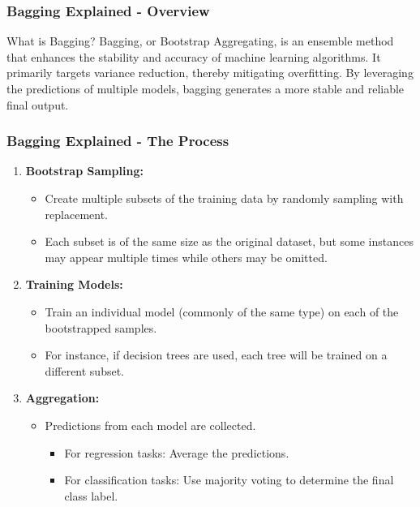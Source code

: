 \documentclass[aspectratio=169]{beamer}
\begin{document}
\begin{frame}[fragile]
    \frametitle{Bagging Explained - Overview}
    \begin{block}{What is Bagging?}
        Bagging, or Bootstrap Aggregating, is an ensemble method that enhances the stability and accuracy of machine learning algorithms. It primarily targets variance reduction, thereby mitigating overfitting. By leveraging the predictions of multiple models, bagging generates a more stable and reliable final output.
    \end{block}
\end{frame}

\begin{frame}[fragile]
    \frametitle{Bagging Explained - The Process}
    \begin{enumerate}
        \item \textbf{Bootstrap Sampling:}
        \begin{itemize}
            \item Create multiple subsets of the training data by randomly sampling with replacement.
            \item Each subset is of the same size as the original dataset, but some instances may appear multiple times while others may be omitted.
        \end{itemize}
        
        \item \textbf{Training Models:}
        \begin{itemize}
            \item Train an individual model (commonly of the same type) on each of the bootstrapped samples.
            \item For instance, if decision trees are used, each tree will be trained on a different subset.
        \end{itemize}

        \item \textbf{Aggregation:}
        \begin{itemize}
            \item Predictions from each model are collected.
            \begin{itemize}
                \item For regression tasks: Average the predictions.
                \item For classification tasks: Use majority voting to determine the final class label.
            \end{itemize}
        \end{itemize}
    \end{enumerate}
\end{frame}
\end{document}
